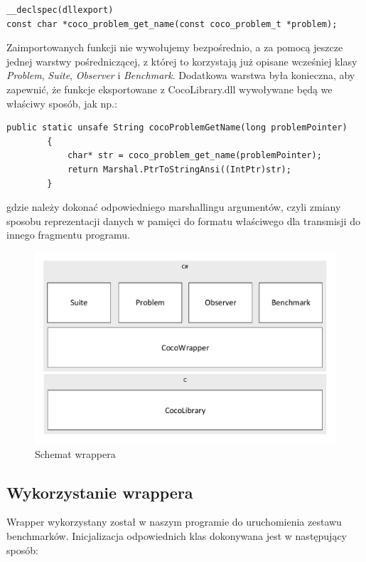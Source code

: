 \documentclass[12pt, twoside, openany, abstract=on]{report}
\theoremstyle{definition}
\begin{document}
\begin{lstlisting}[frame=single]
__declspec(dllexport) 
const char *coco_problem_get_name(const coco_problem_t *problem);
\end{lstlisting}

Zaimportowanych funkcji nie wywołujemy bezpośrednio, a za pomocą jeszcze jednej warstwy pośredniczącej, z której to korzystają już opisane wcześniej klasy \textit{Problem}, \textit{Suite}, \textit{Observer} i \textit{Benchmark}. Dodatkowa warstwa była konieczna, aby zapewnić, że funkcje eksportowane z CocoLibrary.dll wywoływane będą we właściwy sposób, jak np.:

\begin{lstlisting}[frame=single]
public static unsafe String cocoProblemGetName(long problemPointer)
        {
            char* str = coco_problem_get_name(problemPointer);
            return Marshal.PtrToStringAnsi((IntPtr)str);
        }
\end{lstlisting}

gdzie należy dokonać odpowiedniego marshallingu argumentów, czyli zmiany sposobu reprezentacji danych w pamięci do formatu właściwego dla transmisji do innego fragmentu programu.

\begin{figure}[H]
    \centering
    \includegraphics[scale=0.7]{wrapperDiagram.pdf} 
 \caption{Schemat wrappera}
\end{figure}

\subsection{Wykorzystanie wrappera}

Wrapper wykorzystany został w naszym programie do uruchomienia zestawu benchmarków. Inicjalizacja odpowiednich klas dokonywana jest w następujący sposób:
\end{document}
